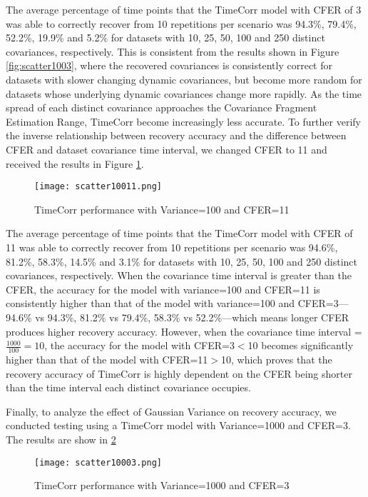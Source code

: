 \documentclass[12pt]{article}
\begin{document}
\begin{enumerate}
The average percentage of time points that the TimeCorr model with CFER of 3 was able to correctly recover from 10 repetitions per scenario was 94.3\%, 79.4\%, 52.2\%, 19.9\% and 5.2\% for datasets with 10, 25, 50, 100 and 250 distinct covariances, respectively. This is consistent from the results shown in Figure \ref{fig:scatter1003}, where the recovered covariances is consistently correct for datasets with slower changing dynamic covariances, but become more random for datasets whose underlying dynamic covariances change more rapidly. As the time spread of each distinct covariance approaches the Covariance Fragment Estimation Range, TimeCorr become increasingly less accurate. To further verify the inverse relationship between recovery accuracy and the difference between CFER and dataset covariance time interval, we changed CFER to 11 and received the results in Figure \ref{fig:scatter10011}.\par
\begin{figure}[h]
\caption{TimeCorr performance with Variance=100 and CFER=11}
\centering
\texttt{[image: scatter10011.png]}
\label{fig:scatter10011}
\end{figure}
The average percentage of time points that the TimeCorr model with CFER of 11 was able to correctly recover from 10 repetitions per scenario was 94.6\%, 81.2\%, 58.3\%, 14.5\% and 3.1\% for datasets with 10, 25, 50, 100 and 250 distinct covariances, respectively. When the covariance time interval is greater than the CFER, the accuracy for the model with variance=100 and CFER=11 is consistently higher than that of the model with variance=100 and CFER=3---94.6\% vs 94.3\%, 81.2\% vs 79.4\%, 58.3\% vs 52.2\%---which means longer CFER produces higher recovery accuracy. However, when the covariance time interval = $\frac{1000}{100}=10$, the accuracy for the model with CFER=3$<$10 becomes significantly higher than that of the model with CFER=11$>$10, which proves that the recovery accuracy of TimeCorr is highly dependent on the CFER being shorter than the time interval each distinct covariance occupies.\par
Finally, to analyze the effect of Gaussian Variance on recovery accuracy, we conducted testing using a TimeCorr model with Variance=1000 and CFER=3. The results are show in \ref{fig:scatter10003}\par
\begin{figure}[h]
\caption{TimeCorr performance with Variance=1000 and CFER=3}
\centering
\texttt{[image: scatter10003.png]}
\label{fig:scatter10003}

\end{figure}
\end{enumerate}
\end{document}

